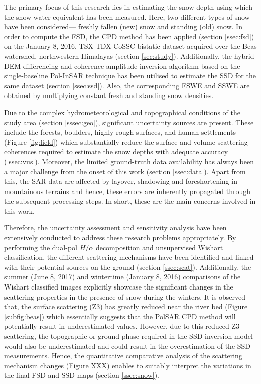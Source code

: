 \documentclass[review]{elsarticle}
\numberwithin{equation}{section}
\numberwithin{figure}{section}
\numberwithin{table}{section}
\begin{document}
The primary focus of this research lies in estimating the snow depth using which the snow water equivalent has been measured. Here, two different types of snow have been considered— freshly fallen (new) snow and standing (old) snow. In order to compute the FSD, the CPD method has been applied (section \ref{ssec:fsd}) on the January 8, 2016, TSX-TDX CoSSC bistatic dataset acquired over the Beas watershed, northwestern Himalayas (section \ref{sec:study}). Additionally, the hybrid DEM differencing and coherence amplitude inversion algorithm based on the single-baseline Pol-InSAR technique has been utilised to estimate the SSD for the same dataset (section \ref{ssec:ssd}). Also, the corresponding FSWE and SSWE are
obtained by multiplying constant fresh and standing snow densities.

Due to the complex hydrometeorological and topographical conditions of the study area (section \ref{sssec:geo}), significant uncertainty sources are present. These include the forests, boulders, highly rough surfaces, and human settlements (Figure \ref{fig:field}) which substantially reduce the surface and volume scattering coherences required to estimate the snow depths with adequate accuracy (\ref{ssec:vus}). Moreover, the limited ground-truth data availability has always been a major challenge from the onset of this work (section \ref{ssec:data}). Apart from this, the SAR data are affected by layover, shadowing and foreshortening in mountainous terrains and hence, these errors are inherently propagated through the subsequent processing steps. In short, these are the main concerns involved in this work.

Therefore, the uncertainty assessment and sensitivity analysis have been extensively conducted to address these research problems appropriately. By performing the dual-pol $H/{\alpha}$ decomposition and unsupervised Wishart classification, the different scattering mechanisms have been identified and linked with their potential sources on the ground (section \ref{ssec:scat}). Additionally, the summer (June 8, 2017) and wintertime (January 8, 2016) comparisons of the Wishart classified images explicitly showcase the significant changes in the scattering properties in the presence of snow during the winters. It is observed that, the surface scattering (Z3) has greatly reduced near the river bed (Figure \ref{subfig:beas}) which essentially suggests that the PolSAR CPD method will potentially result in underestimated values. However, due to this reduced Z3 scattering, the topographic or ground phase required in the SSD inversion model would also be underestimated and could result in the overestimation of the SSD measurements. Hence, the quantitative comparative analysis of the scattering mechanism changes (Figure XXX) enables to suitably interpret the variations in the final FSD and SSD maps (section \ref{ssec:snow}).
\end{document}
